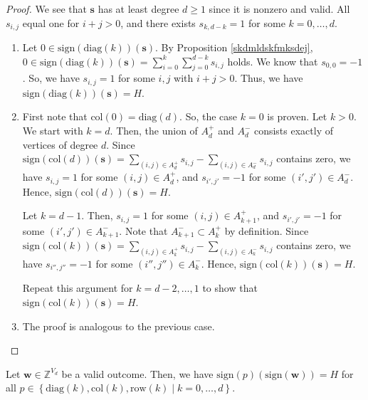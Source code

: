 \begin{proof}
    We see that \( \mathbf{s} \) has at least degree \( d \geq 1 \) since it is nonzero and valid. All \( s_{i,j} \) equal one for \( i + j > 0 \), and there exists \( s_{k, d-k} = 1 \) for some \( k = 0, \dots, d \).

    \begin{enumerate}
        \item Let \(0 \in \mathrm{sign}(\mathrm{diag}(k))(\mathbf{s}) \). By Proposition \ref{skdmldskfmksdej}, \( 0 \in \mathrm{sign}(\mathrm{diag}(k))(\mathbf{s}) = \sum_{i=0}^k \sum_{j=0}^{d-k} s_{i,j} \) holds.
        We know that \( s_{0,0} = -1 \). So, we have \( s_{i,j} = 1 \) for some \( i,j \) with \( i + j > 0 \). Thus, we have \( \mathrm{sign}(\mathrm{diag}(k))(\mathbf{s}) = H \).
        
        \item First note that \( \mathrm{col}(0) = \mathrm{diag}(d) \). So, the case \( k = 0 \) is proven. Let \( k > 0 \). We start with \( k = d \). Then, the union of \( A^+_d \) and \( A^-_d \) consists exactly of vertices of degree \( d \). Since \( \mathrm{sign}(\mathrm{col}(d))(\mathbf{s}) =  \sum_{(i,j) \in A_d^+} s_{i,j} - \sum_{(i,j) \in A_d^-} s_{i,j} \) contains zero, we have \( s_{i,j} = 1 \) for some \( (i,j) \in A_d^+ \), and \( s_{i',j'} = -1 \) for some \( (i',j') \in A_d^- \). Hence, \( \mathrm{sign}(\mathrm{col}(d))(\mathbf{s}) = H \).
        
        Let \( k = d-1 \). Then, \( s_{i,j} = 1 \) for some \( (i,j) \in A_{k+1}^+ \), and \( s_{i',j'} = -1 \) for some \( (i',j') \in A_{k+1}^- \). Note that \( A_{k+1}^- \subset A^+_{k} \) by definition. Since \( \mathrm{sign}(\mathrm{col}(k))(\mathbf{s}) =  \sum_{(i,j) \in A_k^+} s_{i,j} - \sum_{(i,j) \in A_k^-} s_{i,j} \) contains zero, we have \( s_{i'',j''} = -1 \) for some \( (i'',j'') \in A_{k}^- \). Hence, \( \mathrm{sign}(\mathrm{col}(k))(\mathbf{s}) = H \).

        Repeat this argument for \( k = d-2, \dots, 1 \) to show that \( \mathrm{sign}(\mathrm{col}(k))(\mathbf{s}) = H \).

        \item The proof is analogous to the previous case.
    \end{enumerate}
\end{proof}

\begin{corollary}\label{cor:sign-sikjsfnfnuuusus}
    Let \( \mathbf{w} \in \mathbb{Z}^{V_d} \) be a valid outcome. Then, we have \( \mathrm{sign}(p)(\mathrm{sign}(\mathbf{w})) = H \) for all \( p \in \left\{ \mathrm{diag}(k), \mathrm{col}(k), \mathrm{row}(k) \mid k = 0, \dots, d \right\} \).
\end{corollary}


